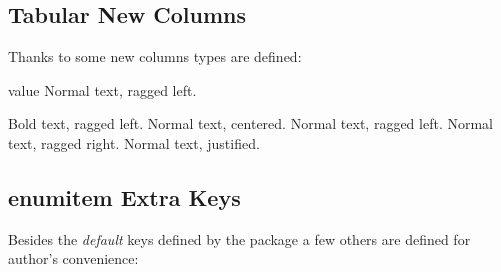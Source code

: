 \documentclass[article,nogeometry,english,tocdepth=3,secdepth=3]{ufrgscca} %
\begin{document}
\subsection{Tabular New Columns}
Thanks to  some new columns types are defined:
\begin{describelist}{value}
	 {  Normal text, ragged left.}

	 {  Bold text, ragged left.}
	 {  Normal text, centered.}
	 {  Normal text, ragged left.}
	 {  Normal text, ragged right.}
	 {  Normal text, justified.}
	\end{describelist}



\subsection{enumitem Extra Keys}
Besides the \emph{default} keys defined by the  package a few others are defined for author's convenience:
\end{document}
